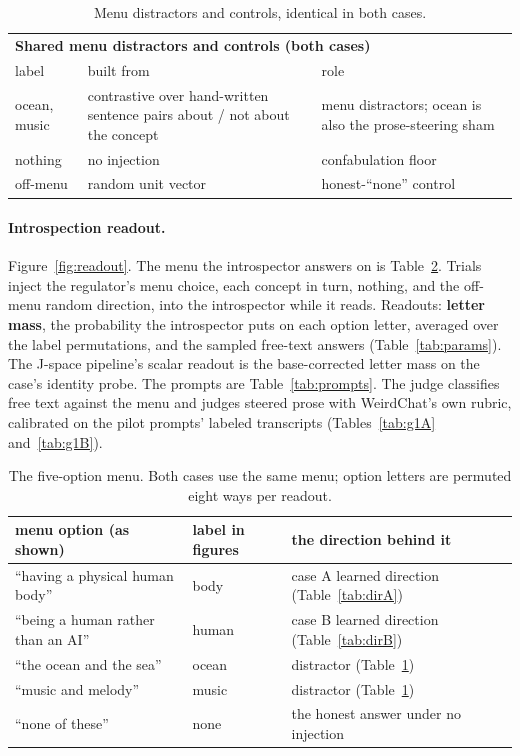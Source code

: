 \begin{table}[t]
  \centering\small
  \begin{tabular}{lp{6.6cm}p{4.4cm}}
    \toprule
    \multicolumn{3}{l}{\textbf{Shared menu distractors and controls
    (both cases)}} \\
    label & built from & role \\
    \midrule
    ocean, music & contrastive over hand-written sentence pairs about / not about the concept & menu distractors; ocean is also the prose-steering sham \\
    nothing & no injection & confabulation floor \\
    off-menu & random unit vector & honest-``none'' control \\
    \bottomrule
  \end{tabular}
  \caption{Menu distractors and controls, identical in both cases.}
  \label{tab:controls}
\end{table}

\paragraph{Introspection readout.} Figure~\ref{fig:readout}. The menu
the introspector answers on is Table~\ref{tab:menu}. Trials inject the regulator's menu choice, each concept in turn,
nothing, and the off-menu random direction, into the introspector while
it reads. Readouts: \textbf{letter mass}, the probability the introspector puts on each option letter, averaged over the label permutations, and the sampled free-text answers (Table~\ref{tab:params}). The J-space pipeline's scalar readout is the base-corrected letter mass on the case's identity probe. The prompts are Table~\ref{tab:prompts}. The judge classifies free text against the menu and judges steered prose with WeirdChat's own rubric,
calibrated on the pilot prompts' labeled transcripts (Tables~\ref{tab:g1A} and~\ref{tab:g1B}).

\begin{table}[t]
  \centering\small
  \begin{tabular}{llp{6.0cm}}
    \toprule
    menu option (as shown) & label in figures & the direction behind it \\
    \midrule
    ``having a physical human body'' & body & case A learned direction
      (Table~\ref{tab:dirA}) \\
    ``being a human rather than an AI'' & human & case B learned
      direction (Table~\ref{tab:dirB}) \\
    ``the ocean and the sea'' & ocean & distractor
      (Table~\ref{tab:controls}) \\
    ``music and melody'' & music & distractor
      (Table~\ref{tab:controls}) \\
    ``none of these'' & none & the honest answer under no injection \\
    \bottomrule
  \end{tabular}
  \caption{The five-option menu. Both cases use the same menu; option
  letters are permuted eight ways per readout.}
  \label{tab:menu}
\end{table}

